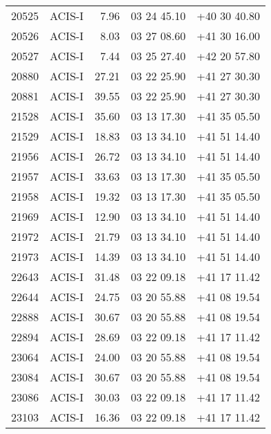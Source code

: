\begin{longtable}{rlrll}
  20525 &     ACIS-I &           7.96 & 03 24 45.10 & +40 30 40.80 \\
  20526 &     ACIS-I &           8.03 & 03 27 08.60 & +41 30 16.00 \\
  20527 &     ACIS-I &           7.44 & 03 25 27.40 & +42 20 57.80 \\
  20880 &     ACIS-I &          27.21 & 03 22 25.90 & +41 27 30.30 \\
  20881 &     ACIS-I &          39.55 & 03 22 25.90 & +41 27 30.30 \\
  21528 &     ACIS-I &          35.60 & 03 13 17.30 & +41 35 05.50 \\
  21529 &     ACIS-I &          18.83 & 03 13 34.10 & +41 51 14.40 \\
  21956 &     ACIS-I &          26.72 & 03 13 34.10 & +41 51 14.40 \\
  21957 &     ACIS-I &          33.63 & 03 13 17.30 & +41 35 05.50 \\
  21958 &     ACIS-I &          19.32 & 03 13 17.30 & +41 35 05.50 \\
  21969 &     ACIS-I &          12.90 & 03 13 34.10 & +41 51 14.40 \\
  21972 &     ACIS-I &          21.79 & 03 13 34.10 & +41 51 14.40 \\
  21973 &     ACIS-I &          14.39 & 03 13 34.10 & +41 51 14.40 \\
  22643 &     ACIS-I &          31.48 & 03 22 09.18 & +41 17 11.42 \\
  22644 &     ACIS-I &          24.75 & 03 20 55.88 & +41 08 19.54 \\
  22888 &     ACIS-I &          30.67 & 03 20 55.88 & +41 08 19.54 \\
  22894 &     ACIS-I &          28.69 & 03 22 09.18 & +41 17 11.42 \\
  23064 &     ACIS-I &          24.00 & 03 20 55.88 & +41 08 19.54 \\
  23084 &     ACIS-I &          30.67 & 03 20 55.88 & +41 08 19.54 \\
  23086 &     ACIS-I &          30.03 & 03 22 09.18 & +41 17 11.42 \\
  23103 &     ACIS-I &          16.36 & 03 22 09.18 & +41 17 11.42 \\
\end{longtable}
